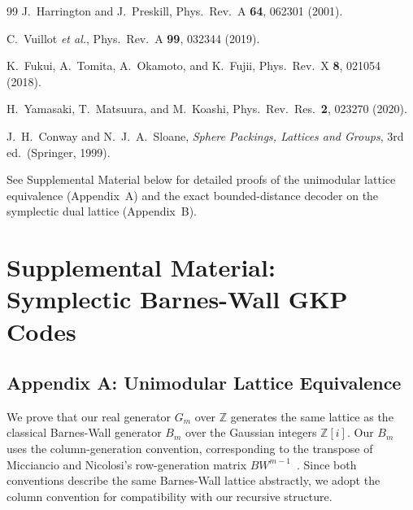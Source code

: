 \documentclass[aps,prl,twocolumn,superscriptaddress]{revtex4-2}
\begin{document}
\begin{thebibliography}{99}
J.~Harrington and J.~Preskill,
Phys.~Rev.~A \textbf{64}, 062301 (2001).

C.~Vuillot \textit{et al.},
Phys.~Rev.~A \textbf{99}, 032344 (2019).

K.~Fukui, A.~Tomita, A.~Okamoto, and K.~Fujii,
Phys.~Rev.~X \textbf{8}, 021054 (2018).

H.~Yamasaki, T.~Matsuura, and M.~Koashi,
Phys.~Rev.~Res.\ \textbf{2}, 023270 (2020).

J.~H.~Conway and N.~J.~A.~Sloane,
\textit{Sphere Packings, Lattices and Groups}, 3rd ed.\ (Springer, 1999).


See Supplemental Material below for detailed proofs of the unimodular lattice equivalence (Appendix~A) and the exact bounded-distance decoder on the symplectic dual lattice (Appendix~B).

\end{thebibliography}

\newpage
\clearpage
\setcounter{page}{1}

\setcounter{equation}{0}
\setcounter{figure}{0}
\setcounter{table}{0}
\renewcommand{\theequation}{S\arabic{equation}}
\renewcommand{\thefigure}{S\arabic{figure}}
\renewcommand{\thetable}{S\arabic{table}}

\section*{Supplemental Material:\\
Symplectic Barnes-Wall GKP Codes}

\subsection*{Appendix A: Unimodular Lattice Equivalence}
\label{app:isomorphism}

We prove that our real generator $G_m$ over $\mathbb{Z}$ generates the same lattice as the classical Barnes-Wall generator $B_m$ over the Gaussian integers $\mathbb{Z}[i]$. Our $B_m$ uses the column-generation convention, corresponding to the transpose of Micciancio and Nicolosi's row-generation matrix $BW^{m-1}$~\cite{micciancio2008}. Since both conventions describe the same Barnes-Wall lattice abstractly, we adopt the column convention for compatibility with our recursive structure.
\end{document}
